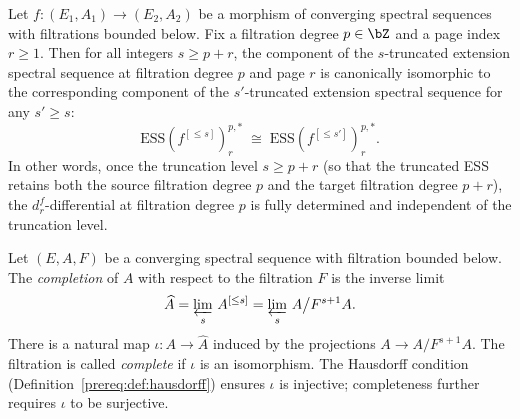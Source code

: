 \begin{proposition}\label{prereq:prop:unbounded-ess-stabilization}
    Let $f: (E_1, A_1) \to (E_2, A_2)$ be a morphism of converging spectral sequences with filtrations bounded below. Fix a filtration degree $p \in \bZ$ and a page index $r \ge 1$. Then for all integers $s \ge p + r$, the component of the $s$-truncated extension spectral sequence at filtration degree $p$ and page $r$ is canonically isomorphic to the corresponding component of the $s'$-truncated extension spectral sequence for any $s' \ge s$:
    $$\mathrm{ESS}(f^{[\le s]})_r^{p,*} \;\cong\; \mathrm{ESS}(f^{[\le s']})_r^{p,*}.$$
    In other words, once the truncation level $s \ge p + r$ (so that the truncated ESS retains both the source filtration degree $p$ and the target filtration degree $p + r$), the $d_r^f$-differential at filtration degree $p$ is fully determined and independent of the truncation level.
\end{proposition}

\begin{definition}\label{prereq:def:filtration-completion}
    \leanok
    Let $(E, A, F)$ be a converging spectral sequence with filtration bounded below. The \emph{completion} of $A$ with respect to the filtration $F$ is the inverse limit
    $$\widehat{A} = \varprojlim_{s}\, A^{[\le s]} = \varprojlim_{s}\, A \big/ F^{s+1} A.$$
    There is a natural map $\iota: A \to \widehat{A}$ induced by the projections $A \to A/F^{s+1}A$. The filtration is called \emph{complete} if $\iota$ is an isomorphism. The Hausdorff condition (Definition~\ref{prereq:def:hausdorff}) ensures $\iota$ is injective; completeness further requires $\iota$ to be surjective.
\end{definition}

